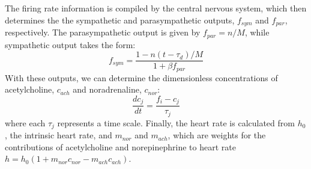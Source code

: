 \documentclass[11pt]{article}
\begin{document}
The firing rate information is compiled by the central nervous system, which then determines the the sympathetic and parasympathetic outputs, $f_{sym}$ and $f_{par}$, respectively.
The parasympathetic output is given by $f_{par} = n/M$, while sympathetic output takes the form:
\begin{equation}
f_{sym} = \frac{1-n(t-\tau_d)/M}{1+\beta f_{par}}
\end{equation}
With these outputs, we can determine the dimensionless concentrations of acetylcholine, $c_{ach}$ and noradrenaline, $c_{nor}$:
\begin{equation}
\label{dcnordt}
\frac{dc_{j}}{dt} = \frac{f_{i}-c_{j}}{\tau_{j}}
\end{equation}
where each $\tau_{j}$ represents a time scale.
Finally, the heart rate is calculated from $h_0$, the intrinsic heart rate, and $m_{nor}$ and $m_{ach}$,
which are weights for the contributions of acetylcholine and norepinephrine to heart rate $h = h_0(1+m_{nor}c_{nor} - m_{ach}c_{ach})$.
\end{document}
